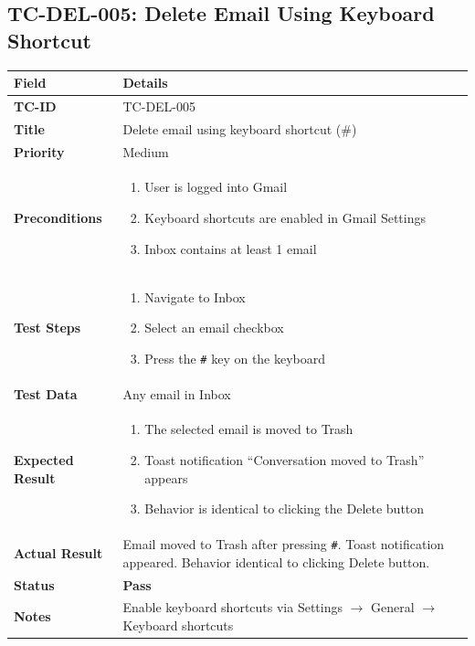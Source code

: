 \documentclass[12pt,a4paper]{article}
\begin{document}
\subsection{TC-DEL-005: Delete Email Using Keyboard Shortcut}

\begin{longtable}{|L{3.5cm}|L{11.5cm}|}
\hline
{}\textbf{Field} & \textbf{Details} \\
\hline
\textbf{TC-ID}           & TC-DEL-005 \\
\hline
\textbf{Title}           & Delete email using keyboard shortcut (\#) \\
\hline
\textbf{Priority}        & Medium \\
\hline
\textbf{Preconditions}   & \begin{enumerate}[noitemsep,topsep=0pt]
                              \item User is logged into Gmail
                              \item Keyboard shortcuts are enabled in Gmail Settings
                              \item Inbox contains at least 1 email
                            \end{enumerate} \\
\hline
\textbf{Test Steps}      & \begin{enumerate}[noitemsep,topsep=0pt]
                              \item Navigate to Inbox
                              \item Select an email checkbox
                              \item Press the \texttt{\#} key on the keyboard
                            \end{enumerate} \\
\hline
\textbf{Test Data}       & Any email in Inbox \\
\hline
\textbf{Expected Result} & \begin{enumerate}[noitemsep,topsep=0pt]
                              \item The selected email is moved to Trash
                              \item Toast notification ``Conversation moved to Trash'' appears
                              \item Behavior is identical to clicking the Delete button
                            \end{enumerate} \\
\hline
\textbf{Actual Result}   & Email moved to Trash after pressing \texttt{\#}. Toast notification appeared. Behavior identical to clicking Delete button. \\
\hline
\textbf{Status}          & \textcolor{passgreen}{\textbf{Pass}} \\
\hline
\textbf{Notes}           & Enable keyboard shortcuts via Settings $\rightarrow$ General $\rightarrow$ Keyboard shortcuts \\
\hline
\end{longtable}
\end{document}

